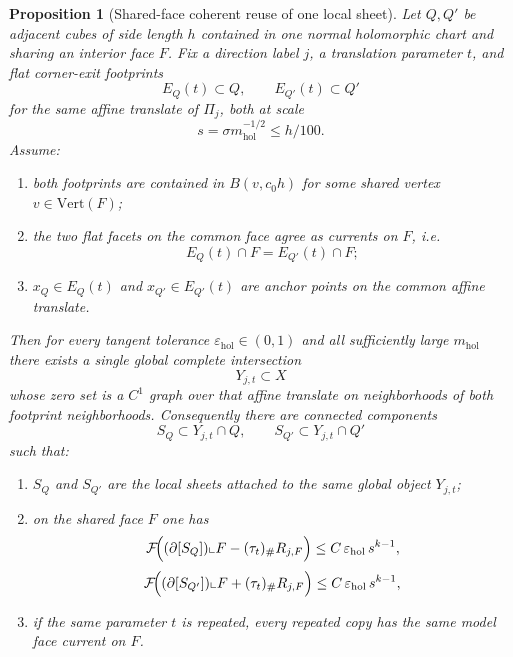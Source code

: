 \documentclass[11pt]{article}
\numberwithin{equation}{section}
\theoremstyle{plain}
\newtheorem{proposition}[theorem]{Proposition}
\theoremstyle{definition}
\theoremstyle{remark}
\newcommand{\eps}{\varepsilon}
\newcommand{\mhol}{m_{\mathrm{hol}}}
\newcommand{\calF}{\mathcal{F}}
\begin{document}
\begin{proposition}[Shared-face coherent reuse of one local sheet]\label{prop:shared-face}
Let $Q,Q'$ be adjacent cubes of side length $h$ contained in one normal holomorphic chart and sharing an interior face $F$.  Fix a direction label $j$, a translation parameter $t$, and flat corner-exit footprints
\[
E_Q(t)\subset Q,
\qquad
E_{Q'}(t)\subset Q'
\]
for the same affine translate of $\Pi_j$, both at scale
\[
s=\sigma \mhol^{-1/2}\le h/100.
\]
Assume:
\begin{enumerate}
\item[\textnormal{(a)}] both footprints are contained in $B(v,c_0h)$ for some shared vertex $v\in\mathrm{Vert}(F)$;
\item[\textnormal{(b)}] the two flat facets on the common face agree as currents on $F$, i.e.
\[
E_Q(t)\cap F=E_{Q'}(t)\cap F;
\]
\item[\textnormal{(c)}] $x_Q\in E_Q(t)$ and $x_{Q'}\in E_{Q'}(t)$ are anchor points on the common affine translate.
\end{enumerate}
Then for every tangent tolerance $\eps_{\mathrm{hol}}\in(0,1)$ and all sufficiently large $\mhol$ there exists a \emph{single} global complete intersection
\[
Y_{j,t}\subset X
\]
whose zero set is a $C^1$ graph over that affine translate on neighborhoods of both footprint neighborhoods.  Consequently there are connected components
\[
S_Q\subset Y_{j,t}\cap Q,
\qquad
S_{Q'}\subset Y_{j,t}\cap Q'
\]
such that:
\begin{enumerate}
\item[\textnormal{(i)}] $S_Q$ and $S_{Q'}$ are the local sheets attached to the same global object $Y_{j,t}$;
\item[\textnormal{(ii)}] on the shared face $F$ one has
\[
\calF\!\Bigl((\partial[S_Q])\llcorner F-(\tau_t)_\#R_{j,F}\Bigr)
\le C\,\eps_{\mathrm{hol}}\,s^{k-1},
\]
\[
\calF\!\Bigl((\partial[S_{Q'}])\llcorner F+(\tau_t)_\#R_{j,F}\Bigr)
\le C\,\eps_{\mathrm{hol}}\,s^{k-1},
\]
\item[\textnormal{(iii)}] if the same parameter $t$ is repeated, every repeated copy has the same model face current on $F$.
\end{enumerate}
\end{proposition}
\end{document}
